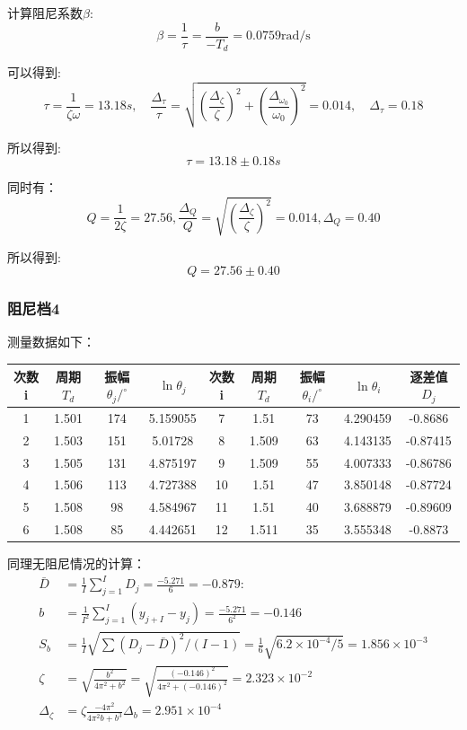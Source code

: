 \documentclass[UTF8]{ctexart}
\begin{document}
计算阻尼系数$\beta$:
$$
\beta=\frac{1}{\tau}=\frac{b}{-T_{d}}=0.0759 \mathrm{rad} / \mathrm{s}
$$

可以得到:
$$
\tau=\frac{1}{\zeta \omega}=13.18 s, \quad \frac{\Delta_{\tau}}{\tau}=\sqrt{\left(\frac{\Delta_{\zeta}}{\zeta}\right)^{2}+\left(\frac{\Delta_{\omega_{0}}}{\omega_{0}}\right)^{2}}=0.014, \quad \Delta_{\tau}=0.18
$$

所以得到:
$$
\tau=13.18 \pm 0.18 s
$$

同时有：
$$
Q=\frac{1}{2 \zeta}=27.56, \frac{\Delta_{Q}}{Q}=\sqrt{\left(\frac{\Delta_{\zeta}}{\zeta}\right)^{2}}=0.014, \Delta_{Q}=0.40
$$

所以得到:
$$
Q=27.56 \pm 0.40
$$


\subsubsection{阻尼档4}

测量数据如下：

\begin{tabular}{|c|c|c|c|c|c|c|c|c|}
    \hline   次数  i &  周期$T_d$&振幅  $\theta_{j} /^{\circ}$ & $\ln \theta_{j} $&  次数  i &周期$T_d$&  振幅  $\theta_{i} /^{\circ}$ & $\ln \theta_{i}$& 逐差值$D_j$ \\
    \hline 1 & 1.501 & 174 & 5.159055 & 7 & 1.51 & 73 & 4.290459 & -0.8686 \\
    \hline 2 & 1.503 & 151 & 5.01728 & 8 & 1.509 & 63 & 4.143135 & -0.87415 \\
    \hline 3 & 1.505 & 131 & 4.875197 & 9 & 1.509 & 55 & 4.007333 & -0.86786 \\
    \hline 4 & 1.506 & 113 & 4.727388 & 10 & 1.51 & 47 & 3.850148 & -0.87724 \\
    \hline 5 & 1.508 & 98 & 4.584967 & 11 & 1.51 & 40 & 3.688879 & -0.89609 \\
    \hline 6 & 1.508 & 85 & 4.442651 & 12 & 1.511 & 35 & 3.555348 & -0.8873 \\
    \hline
\end{tabular}

同理无阻尼情况的计算：
\begin{align}
    \bar{D}&=\frac{1}{I} \sum_{j=1}^{I} D_{j}=\frac{-5.271}{6}=-0.879:  \nonumber  \\
    b&=\frac{1}{I^{2}} \sum_{j=1}^{I}\left(y_{j+I}-y_{j}\right)=\frac{-5.271}{6^{2}}=-0.146 \nonumber \\
    S_{b}&=\frac{1}{I} \sqrt{\sum\left(D_{j}-\bar{D}\right)^{2} /(I-1)}=\frac{1}{6} \sqrt{6.2\times 10^{-4} /5}=1.856 \times 10^{-3} \nonumber \\
    \zeta&=\sqrt{\frac{b^{2}}{4 \pi^{2}+b^{2}}}=\sqrt{\frac{{(-0.146)}^{2}}{4 \pi^{2}+{(-0.146)}^{2}}}=2.323 \times 10^{-2}\nonumber\\
    \Delta_{\zeta}&=\zeta \frac{-4 \pi^{2}}{4 \pi^{2} b+b^{3}} \Delta_{b}=2.951 \times 10^{-4}\nonumber
\end{align}
\end{document}
